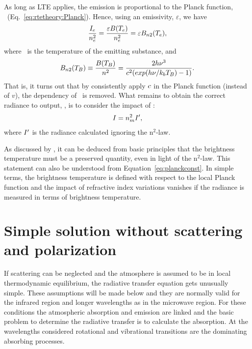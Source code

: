As long as LTE applies, the emission is proportional to the Planck function,
\Planck\ (Eq.~\ref{eq:rtetheory:Planck}). Hence, using an emissivity,
$\varepsilon$, we have
\begin{equation}
  \frac{I_{e}}{n_{e}^2} = \frac{\varepsilon B(T_{e})}{n_{e}^2}=
   \varepsilon B_{n2}(T_{e}),
\end{equation}
where \ is the temperature of the emitting substance, and
\begin{equation}
  \label{eq:planckconst}
  B_{n2}(T_{B})\equiv
  \frac{B(T_{B})}{n^{2}} = \frac{2h\nu^3}
  {c^{2}(exp(h\nu/k_bT_{B})-1)}.
\end{equation}
That is, it turns out that by consistently apply $c$ in the Planck
function (instead of $v$), the dependency of \ is removed. What
remains to obtain the correct radiance to output, \StoI, is to consider the
impact of :
\begin{equation}
  \label{eq:n2finalstep}
  I = n_{m}^2I',
\end{equation}
where $I'$ is the radiance calculated ignoring the n$^2$-law.

As discussed by \citet{matlzer:radia:06}, it can be deduced from basic
principles that the brightness temperature must be a preserved quantity, even
in light of the n$^2$-law. This statement can also be understood from
Equation~\ref{eq:planckconst}. In simple terms, the brightness temperature is
defined with respect to the local Planck function and the impact of refractive
index variations vanishes if the radiance is measured in terms of brightness
temperature. 



\section{Simple solution without scattering and polarization}

 If scattering can be neglected and the atmosphere is assumed to be in
 local thermodynamic equilibrium, the radiative transfer equation gets
 unusually simple. These assumptions will be made below and
 they are normally valid for the infrared region and longer
 wavelengths as in the microwave region. For these conditions the
 atmospheric absorption and emission are linked and the basic problem
 to determine the radiative transfer is to calculate the absorption.
 At the wavelengths considered rotational and vibrational transitions
 are the dominating absorbing processes.

